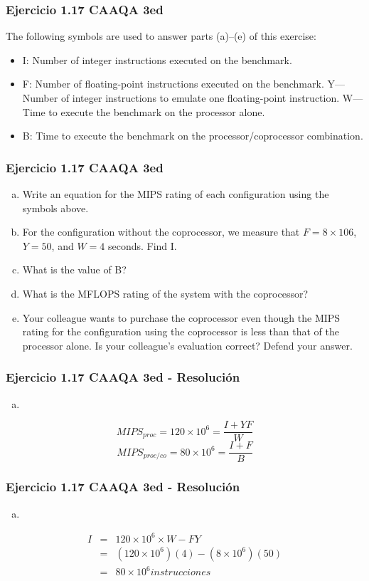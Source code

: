 \documentclass{beamer}
\begin{document}
\begin{frame}
\frametitle{Ejercicio 1.17 CAAQA 3ed}
The following symbols are used to answer parts (a)–(e) of this exercise:
\begin{itemize}
\item I: Number of integer instructions executed on the benchmark.
\item F: Number of floating-point instructions executed on the benchmark. Y—Number of integer instructions to emulate one floating-point instruction. W—Time to execute the benchmark on the processor alone.
\item B: Time to execute the benchmark on the processor/coprocessor combination.
\end{itemize}
\end{frame}

\begin{frame}
\frametitle{Ejercicio 1.17 CAAQA 3ed}
\begin{enumerate}[a.]
\item Write an equation for the MIPS rating of each configuration using the symbols above.
\item For the configuration without the coprocessor, we measure that $F = 8 \times 106$, $Y = 50$, and $W = 4$ seconds. Find I.
\item What is the value of B?
\item What is the MFLOPS rating of the system with the coprocessor?
\item Your colleague wants to purchase the coprocessor even though the MIPS rating for the configuration using the coprocessor is less than that of the processor alone. Is your colleague’s evaluation correct? Defend your answer.
\end{enumerate}
\end{frame}

\begin{frame}
\frametitle{Ejercicio 1.17 CAAQA 3ed - Resolución}
\begin{enumerate}[a.]
\item
\end{enumerate}
\[ MIPS_{proc} = 120 \times 10^6 = \frac{I + YF}{W} \]
\[ MIPS_{proc/co} = 80 \times 10^6 = \frac{I + F}{B} \]
\end{frame}

\begin{frame}
\frametitle{Ejercicio 1.17 CAAQA 3ed - Resolución}
\begin{enumerate}[b.]
\item
\end{enumerate}
\begin{eqnarray*}
I &=& 120 \times 10^6 \times W - FY \\
 &=& (120 \times 10^6)(4) - (8 \times 10^6 )(50) \\
 &=& 80 \times 10^6 instrucciones
\end{eqnarray*}
\end{frame}
\end{document}
